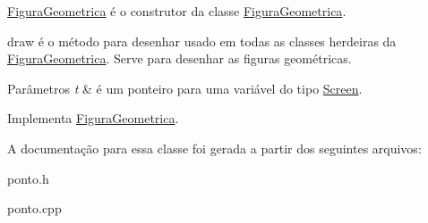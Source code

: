 \mbox{\hyperlink{class_figura_geometrica}{Figura\+Geometrica}} é o construtor da classe \mbox{\hyperlink{class_figura_geometrica}{Figura\+Geometrica}}. 

draw é o método para desenhar usado em todas as classes herdeiras da \mbox{\hyperlink{class_figura_geometrica}{Figura\+Geometrica}}. Serve para desenhar as figuras geométricas. 
\begin{DoxyParams}{Parâmetros}
{\em t} & é um ponteiro para uma variável do tipo \mbox{\hyperlink{class_screen}{Screen}}. \\
\hline
\end{DoxyParams}


Implementa \mbox{\hyperlink{class_figura_geometrica_a8ee8dedc060b6059a805ea091aef2c41}{Figura\+Geometrica}}.



A documentação para essa classe foi gerada a partir dos seguintes arquivos\+:\begin{DoxyCompactItemize}
\item 
ponto.\+h\item 
ponto.\+cpp\end{DoxyCompactItemize}
